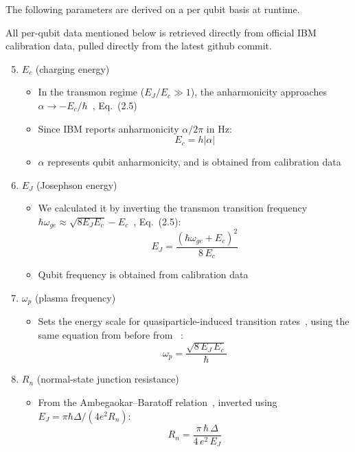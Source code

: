 \documentclass[showpacs,amsmath,amssymb,twocolumn,superscriptaddress,notitlepage,preprintnumbers,pra]{revtex4-1}
\newcommand{\abs}[1]{\lvert#1\rvert}
\begin{document}
The following parameters are derived on a per qubit basis at runtime.

All per-qubit data mentioned below is retrieved directly from official IBM calibration data, pulled directly from the latest github commit.

\begin{enumerate}
	\setcounter{enumi}{4}
	\item $E_c$ (charging energy)
	      \begin{itemize}
		      \item In the transmon regime ($E_J/E_c \gg 1$), the anharmonicity approaches $\alpha \to -E_c/\hbar$~\cite{koch2007transmon}, Eq.~(2.5)
		      \item Since IBM reports anharmonicity $\alpha/2\pi$ in Hz:
		            \[
			            E_c = h \abs \alpha
		            \]
		      \item $\alpha$ represents qubit anharmonicity, and is obtained from calibration data
	      \end{itemize}

	\item $E_J$ (Josephson energy)
	      \begin{itemize}
		      \item We calculated it by inverting the transmon transition frequency $\hbar\omega_{ge} \approx \sqrt{8 E_J E_c} - E_c$~\cite{koch2007transmon}, Eq.~(2.5):
		            \[
			            E_J = \frac{(\hbar\omega_{ge} + E_c)^2}{8\,E_c}
		            \]
		      \item Qubit frequency is obtained from calibration data
	      \end{itemize}

	\item $\omega_p$ (plasma frequency)
	      \begin{itemize}
		      \item Sets the energy scale for quasiparticle-induced transition rates~\cite{catelani2011qp_relaxation}, using the same equation from before from ~\cite{koch2007transmon}:
		            \[
			            \omega_p = \frac{\sqrt{8\,E_J\,E_c}}{\hbar}
		            \]
	      \end{itemize}

	\item $R_n$ (normal-state junction resistance)
	      \begin{itemize}
		      \item From the Ambegaokar--Baratoff relation~\cite{ambegaokar1963tunneling}, inverted using $E_J = \pi\hbar\Delta/(4e^2 R_n)$:
		            \[
			            R_n = \frac{\pi\,\hbar\,\Delta}{4\,e^2\,E_J}
		            \]
	      \end{itemize}


\end{enumerate}
\end{document}
